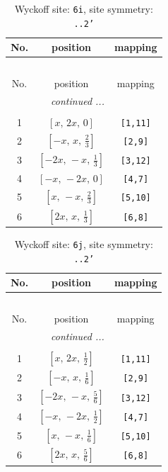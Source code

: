 \documentclass[fleqn,8pt]{jsarticle}
\begin{document}
\renewcommand{\arraystretch}{1.2}
\begin{longtable}{ccc}
\caption{Wyckoff site: {\tt 6i}, site symmetry: {\tt ..2'}}
 \\
 \hline \hline
No. & position & mapping \\ \hline \endfirsthead

\multicolumn{2}{l}{\tablename\ \thetable{}} \\
 \hline \hline
No. & position & mapping \\ \hline \endhead

 \hline \hline
\multicolumn{2}{r}{\footnotesize\it continued ...} \\ \endfoot

 \hline \hline
\multicolumn{2}{r}{} \\ \endlastfoot

1 & $\left[ x,\, 2 x,\, 0 \right]$ & {\tt [1,11]} \\ \hline
2 & $\left[ - x,\, x,\, \frac{2}{3} \right]$ & {\tt [2,9]} \\ \hline
3 & $\left[ - 2 x,\, - x,\, \frac{1}{3} \right]$ & {\tt [3,12]} \\ \hline
4 & $\left[ - x,\, - 2 x,\, 0 \right]$ & {\tt [4,7]} \\ \hline
5 & $\left[ x,\, - x,\, \frac{2}{3} \right]$ & {\tt [5,10]} \\ \hline
6 & $\left[ 2 x,\, x,\, \frac{1}{3} \right]$ & {\tt [6,8]} \\
\end{longtable}
\renewcommand{\arraystretch}{1.2}
\begin{longtable}{ccc}
\caption{Wyckoff site: {\tt 6j}, site symmetry: {\tt ..2'}}
 \\
 \hline \hline
No. & position & mapping \\ \hline \endfirsthead

\multicolumn{2}{l}{\tablename\ \thetable{}} \\
 \hline \hline
No. & position & mapping \\ \hline \endhead

 \hline \hline
\multicolumn{2}{r}{\footnotesize\it continued ...} \\ \endfoot

 \hline \hline
\multicolumn{2}{r}{} \\ \endlastfoot

1 & $\left[ x,\, 2 x,\, \frac{1}{2} \right]$ & {\tt [1,11]} \\ \hline
2 & $\left[ - x,\, x,\, \frac{1}{6} \right]$ & {\tt [2,9]} \\ \hline
3 & $\left[ - 2 x,\, - x,\, \frac{5}{6} \right]$ & {\tt [3,12]} \\ \hline
4 & $\left[ - x,\, - 2 x,\, \frac{1}{2} \right]$ & {\tt [4,7]} \\ \hline
5 & $\left[ x,\, - x,\, \frac{1}{6} \right]$ & {\tt [5,10]} \\ \hline
6 & $\left[ 2 x,\, x,\, \frac{5}{6} \right]$ & {\tt [6,8]} \\
\end{longtable}
\end{document}
